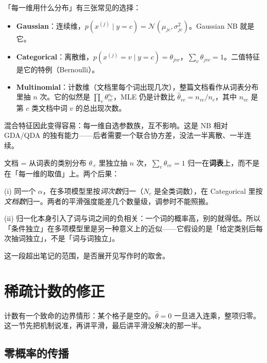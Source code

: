 \documentclass[11pt,a4paper,fontset=windows,zihao=-4]{ctexart}
\newcommand{\Ncal}{\mathcal{N}}
\begin{document}
「每一维用什么分布」有三张常见的选择：

\begin{itemize}
  \item \textbf{Gaussian}：连续维，$p(x^{(j)}\mid y=c)=\Ncal(\mu_{jc},\sigma_{jc}^2)$。Gaussian NB 就是它。
  \item \textbf{Categorical}：离散维，$p(x^{(j)}=v\mid y=c)=\theta_{jvc}$，$\sum_v\theta_{jvc}=1$。二值特征是它的特例（Bernoulli）。
  \item \textbf{Multinomial}：计数维（文档里每个词出现几次），整篇文档看作从词表分布里抽 $n$ 次。它的似然是 $\prod_v\theta_{vc}^{n_v}$，MLE 仍是计数比 $\hat\theta_{vc}=n_{vc}/n_c$，其中 $n_{vc}$ 是第 $c$ 类文档中词 $v$ 的总出现次数。
\end{itemize}

混合特征因此变得容易：每一维自选参数族，互不影响。这是 NB 相对 GDA/QDA 的独有能力——后者需要一个联合协方差，没法一半离散、一半连续。

\begin{add}
文档 = 从词表的类别分布 $\theta_{\cdot c}$ 里独立抽 $n$ 次，$\sum_v\theta_{vc}=1$ 归一在\textbf{词表}上，而不是在「每一维的取值」上。两个后果：

(i) 同一个 $\alpha$，在多项模型里按\emph{词次数}归一（$N_c$ 是全类词数），在 Categorical 里按\emph{文档数}归一。两者的平滑强度能差几个数量级，调参时不能照搬。

(ii) 归一化本身引入了词与词之间的负相关：一个词的概率高，别的就得低。所以「条件独立」在多项模型里是另一种意义上的近似——它假设的是「给定类别后每次抽词独立」，不是「词与词独立」。

这一段超出笔记的范围，是否展开见写作时的取舍。
\end{add}


\section{稀疏计数的修正}

计数有一个致命的边界情形：某个格子是空的。$\hat\theta=0$ 一旦进入连乘，整项归零。这一节先把机制说准，再讲平滑，最后讲平滑没解决的那一半。

\subsection{零概率的传播}
\end{document}
